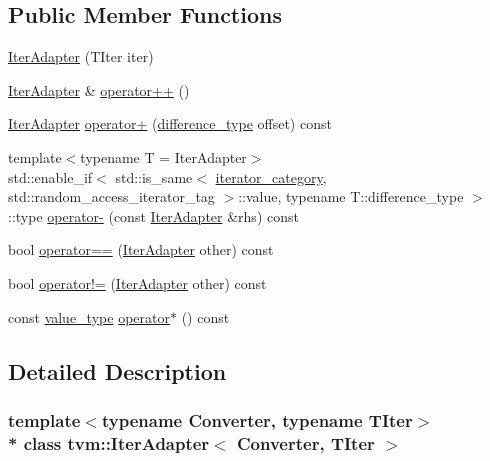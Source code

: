 \subsection*{Public Member Functions}
\begin{DoxyCompactItemize}
\item 
\hyperlink{classtvm_1_1IterAdapter_a5b0e7480919d0179691292f053e8b58a}{Iter\+Adapter} (T\+Iter iter)
\item 
\hyperlink{classtvm_1_1IterAdapter}{Iter\+Adapter} \& \hyperlink{classtvm_1_1IterAdapter_a26651fc29c5a8b7d3902cec7c68978c3}{operator++} ()
\item 
\hyperlink{classtvm_1_1IterAdapter}{Iter\+Adapter} \hyperlink{classtvm_1_1IterAdapter_a632448e530261af4f8d20cd1c7d6f604}{operator+} (\hyperlink{classtvm_1_1IterAdapter_a6fcccf32d94242ce3b0613db5bcd53d5}{difference\+\_\+type} offset) const 
\item 
{\footnotesize template$<$typename T  = Iter\+Adapter$>$ }\\std\+::enable\+\_\+if$<$ std\+::is\+\_\+same$<$ \hyperlink{classtvm_1_1IterAdapter_a2fa322bdb58941c57c6f25ea53678ed7}{iterator\+\_\+category}, std\+::random\+\_\+access\+\_\+iterator\+\_\+tag $>$\+::value, typename T\+::difference\+\_\+type $>$\+::type \hyperlink{classtvm_1_1IterAdapter_a730c42eead8dc1ae5b0d5dd8b6c749a9}{operator-\/} (const \hyperlink{classtvm_1_1IterAdapter}{Iter\+Adapter} \&rhs) const 
\item 
bool \hyperlink{classtvm_1_1IterAdapter_a8bb0653979acc063862d800adb846d64}{operator==} (\hyperlink{classtvm_1_1IterAdapter}{Iter\+Adapter} other) const 
\item 
bool \hyperlink{classtvm_1_1IterAdapter_adddb09d93d6148a0bd9a7763b5d603f6}{operator!=} (\hyperlink{classtvm_1_1IterAdapter}{Iter\+Adapter} other) const 
\item 
const \hyperlink{classtvm_1_1IterAdapter_a920384d7073ed15812199181625d857e}{value\+\_\+type} \hyperlink{classtvm_1_1IterAdapter_a19d48c13586d042b39484bf8bae24aca}{operator$\ast$} () const 
\end{DoxyCompactItemize}


\subsection{Detailed Description}
\subsubsection*{template$<$typename Converter, typename T\+Iter$>$\\*
class tvm\+::\+Iter\+Adapter$<$ Converter, T\+Iter $>$}


